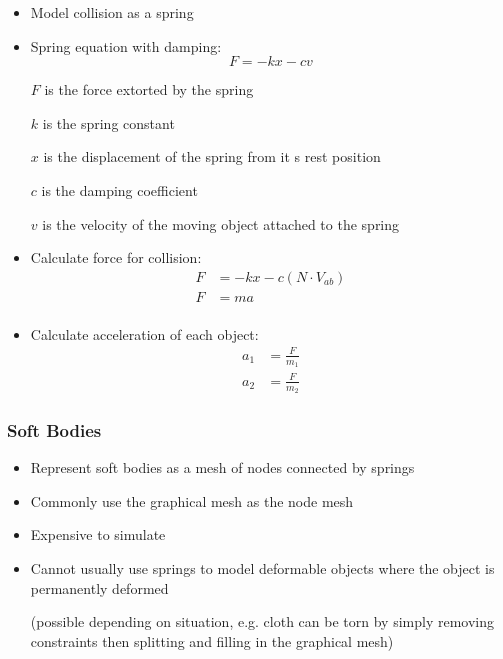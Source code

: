 \documentclass[a4paper]{article}
\begin{document}
\begin{itemize}
  \item
    Model collision as a spring

  \item
    Spring equation with damping:
    \[
      F = -kx - cv
    \]

    $F$ is the force extorted by the spring

    $k$ is the spring constant

    $x$ is the displacement of the spring from it s rest position

    $c$ is the damping coefficient

    $v$ is the velocity of the moving object attached to the spring

  \item
    Calculate force for collision:
    \begin{align*}
      F &= -kx - c(N \cdot V_{ab}) \\
      F &= ma \\
    \end{align*}

  \item
    Calculate acceleration of each object:
    \begin{align*}
      a_{1} &= \frac{F}{m_{1}} \\
      a_{2} &= \frac{F}{m_{2}}
    \end{align*}

\end{itemize}

\subsubsection{Soft Bodies}

\begin{itemize}
  \item
    Represent soft bodies as a mesh of nodes connected by springs

  \item
    Commonly use the graphical mesh as the node mesh

  \item
    Expensive to simulate

  \item
    Cannot usually use springs to model deformable objects where the object is
    permanently deformed

    (possible depending on situation, e.g. cloth can be torn by simply removing
    constraints then splitting and filling in the graphical mesh)

\end{itemize}
\end{document}
